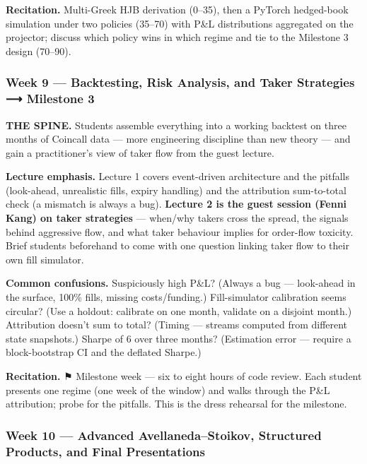 \documentclass[
]{article}
\begin{document}
\textbf{Recitation.} Multi-Greek HJB derivation (0--35), then a PyTorch
hedged-book simulation under two policies (35--70) with P\&L
distributions aggregated on the projector; discuss which policy wins in
which regime and tie to the Milestone 3 design (70--90).

\subsubsection{Week 9 --- Backtesting, Risk Analysis, and Taker
Strategies ⟶ Milestone
3}\label{week-9-backtesting-risk-analysis-and-taker-strategies-milestone-3}

\textbf{THE SPINE.} Students assemble everything into a working backtest
on three months of Coincall data --- more engineering discipline than
new theory --- and gain a practitioner's view of taker flow from the
guest lecture.

\textbf{Lecture emphasis.} Lecture 1 covers event-driven architecture
and the pitfalls (look-ahead, unrealistic fills, expiry handling) and
the attribution sum-to-total check (a mismatch is always a bug).
\textbf{Lecture 2 is the guest session (Fenni Kang) on taker strategies}
--- when/why takers cross the spread, the signals behind aggressive
flow, and what taker behaviour implies for order-flow toxicity. Brief
students beforehand to come with one question linking taker flow to
their own fill simulator.

\textbf{Common confusions.} Suspiciously high P\&L? (Always a bug ---
look-ahead in the surface, 100\% fills, missing costs/funding.)
Fill-simulator calibration seems circular? (Use a holdout: calibrate on
one month, validate on a disjoint month.) Attribution doesn't sum to
total? (Timing --- streams computed from different state snapshots.)
Sharpe of 6 over three months? (Estimation error --- require a
block-bootstrap CI and the deflated Sharpe.)

\textbf{Recitation.} ⚑ Milestone week --- six to eight hours of code
review. Each student presents one regime (one week of the window) and
walks through the P\&L attribution; probe for the pitfalls. This is the
dress rehearsal for the milestone.

\subsubsection{Week 10 --- Advanced Avellaneda--Stoikov, Structured
Products, and Final
Presentations}\label{week-10-advanced-avellanedastoikov-structured-products-and-final-presentations}
\end{document}
